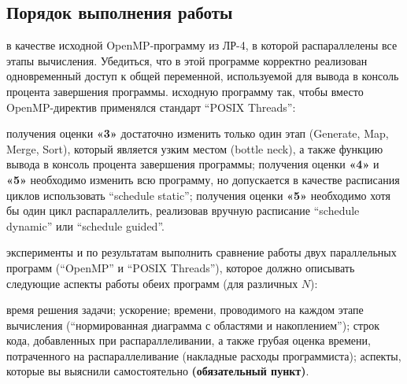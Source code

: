 \subsection{Порядок выполнения работы}
\begin{enumerate}
     в качестве исходной OpenMP-программу из ЛР-4, в которой распараллелены все этапы вычисления. Убедиться, что в этой программе корректно реализован одновременный доступ к общей переменной, используемой для вывода в консоль процента завершения программы.
     исходную программу так, чтобы вместо OpenMP-ди\-рек\-тив применялся стандарт ``POSIX Threads'':
        \begin{itemize}
             получения оценки \textbf{«3»} достаточно изменить только один этап (Generate, Map, Merge, Sort), который является узким местом (bottle neck), а также функцию вывода в консоль процента завершения программы;
             получения оценки \textbf{«4»} и \textbf{«5»} необходимо изменить всю программу, но допускается в качестве расписания циклов использовать ``schedule static'';
             получения оценки \textbf{«5»} необходимо хотя бы один цикл распараллелить, реализовав вручную расписание ``schedule dynamic'' или ``schedule guided''.
        \end{itemize}
     эксперименты и по результатам выполнить сравнение работы двух параллельных программ (``OpenMP'' и ``POSIX Threads''), которое должно описывать следующие аспекты работы обеих программ (для различных $N$):
        \begin{itemize}
             время решения задачи;
             ускорение;
             времени, проводимого на каждом этапе вычисления (``нормированная
диаграмма с областями и накоплением'');
             строк кода, добавленных при распараллеливании, а также грубая оценка
времени, потраченного на распараллеливание (накладные расходы программиста);
             аспекты, которые вы выяснили самостоятельно \textbf{(обязательный пункт)}.
        \end{itemize}
\end{enumerate}

